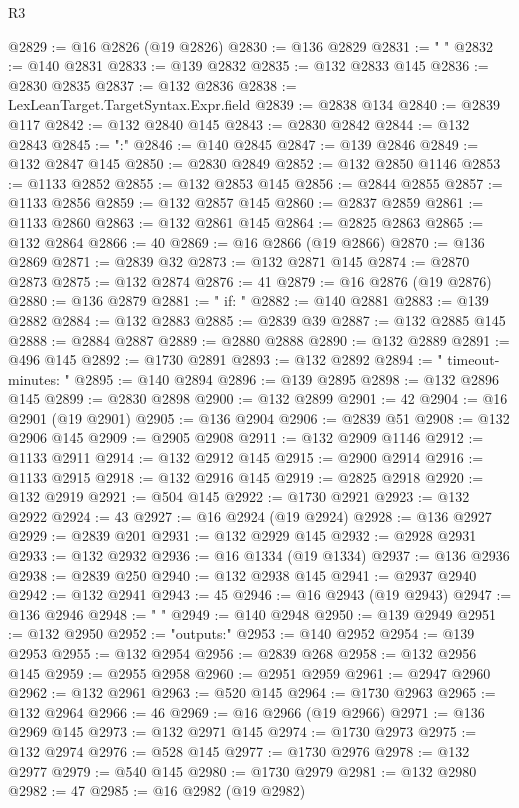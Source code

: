 \begin{lexlean}{R3}
\begin{coremodule}
@2829 := @16 @2826 (@19 @2826)
@2830 := @136 @2829
@2831 := "  "
@2832 := @140 @2831
@2833 := @139 @2832
@2835 := @132 @2833 @145
@2836 := @2830 @2835
@2837 := @132 @2836
@2838 := LexLeanTarget.TargetSyntax.Expr.field
@2839 := @2838 @134
@2840 := @2839 @117
@2842 := @132 @2840 @145
@2843 := @2830 @2842
@2844 := @132 @2843
@2845 := ":"
@2846 := @140 @2845
@2847 := @139 @2846
@2849 := @132 @2847 @145
@2850 := @2830 @2849
@2852 := @132 @2850 @1146
@2853 := @1133 @2852
@2855 := @132 @2853 @145
@2856 := @2844 @2855
@2857 := @1133 @2856
@2859 := @132 @2857 @145
@2860 := @2837 @2859
@2861 := @1133 @2860
@2863 := @132 @2861 @145
@2864 := @2825 @2863
@2865 := @132 @2864
@2866 := 40
@2869 := @16 @2866 (@19 @2866)
@2870 := @136 @2869
@2871 := @2839 @32
@2873 := @132 @2871 @145
@2874 := @2870 @2873
@2875 := @132 @2874
@2876 := 41
@2879 := @16 @2876 (@19 @2876)
@2880 := @136 @2879
@2881 := "    if: "
@2882 := @140 @2881
@2883 := @139 @2882
@2884 := @132 @2883
@2885 := @2839 @39
@2887 := @132 @2885 @145
@2888 := @2884 @2887
@2889 := @2880 @2888
@2890 := @132 @2889
@2891 := @496 @145
@2892 := @1730 @2891
@2893 := @132 @2892
@2894 := "    timeout-minutes: "
@2895 := @140 @2894
@2896 := @139 @2895
@2898 := @132 @2896 @145
@2899 := @2830 @2898
@2900 := @132 @2899
@2901 := 42
@2904 := @16 @2901 (@19 @2901)
@2905 := @136 @2904
@2906 := @2839 @51
@2908 := @132 @2906 @145
@2909 := @2905 @2908
@2911 := @132 @2909 @1146
@2912 := @1133 @2911
@2914 := @132 @2912 @145
@2915 := @2900 @2914
@2916 := @1133 @2915
@2918 := @132 @2916 @145
@2919 := @2825 @2918
@2920 := @132 @2919
@2921 := @504 @145
@2922 := @1730 @2921
@2923 := @132 @2922
@2924 := 43
@2927 := @16 @2924 (@19 @2924)
@2928 := @136 @2927
@2929 := @2839 @201
@2931 := @132 @2929 @145
@2932 := @2928 @2931
@2933 := @132 @2932
@2936 := @16 @1334 (@19 @1334)
@2937 := @136 @2936
@2938 := @2839 @250
@2940 := @132 @2938 @145
@2941 := @2937 @2940
@2942 := @132 @2941
@2943 := 45
@2946 := @16 @2943 (@19 @2943)
@2947 := @136 @2946
@2948 := "    "
@2949 := @140 @2948
@2950 := @139 @2949
@2951 := @132 @2950
@2952 := "outputs:"
@2953 := @140 @2952
@2954 := @139 @2953
@2955 := @132 @2954
@2956 := @2839 @268
@2958 := @132 @2956 @145
@2959 := @2955 @2958
@2960 := @2951 @2959
@2961 := @2947 @2960
@2962 := @132 @2961
@2963 := @520 @145
@2964 := @1730 @2963
@2965 := @132 @2964
@2966 := 46
@2969 := @16 @2966 (@19 @2966)
@2971 := @136 @2969 @145
@2973 := @132 @2971 @145
@2974 := @1730 @2973
@2975 := @132 @2974
@2976 := @528 @145
@2977 := @1730 @2976
@2978 := @132 @2977
@2979 := @540 @145
@2980 := @1730 @2979
@2981 := @132 @2980
@2982 := 47
@2985 := @16 @2982 (@19 @2982)

\end{coremodule}
\end{lexlean}

